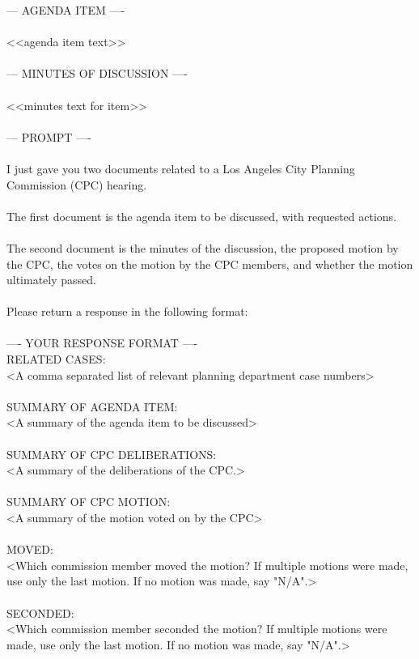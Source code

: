 --- AGENDA ITEM ----\\ 
\\ 
<<agenda item text>>\\ 
\\ 
--- MINUTES OF DISCUSSION ----\\ 
\\ 
<<minutes text for item>>\\ 
\\ 
--- PROMPT ----\\ 
\\ 
I just gave you two documents related to a Los Angeles City Planning Commission (CPC) hearing.\\ 
\\ 
The first document is the agenda item to be discussed, with requested actions.\\ 
\\ 
The second document is the minutes of the discussion, the proposed motion by the CPC, the votes on the motion by the CPC members, and whether the motion ultimately passed.\\ 
\\ 
Please return a response in the following format:\\ 
\\ 
---- YOUR RESPONSE FORMAT ----\\ 
RELATED CASES:\\ 
<A comma separated list of relevant planning department case numbers>\\ 
\\ 
SUMMARY OF AGENDA ITEM:\\ 
<A summary of the agenda item to be discussed>\\ 
\\ 
SUMMARY OF CPC DELIBERATIONS:\\ 
<A summary of the deliberations of the CPC.>\\ 
\\ 
SUMMARY OF CPC MOTION:\\ 
<A summary of the motion voted on by the CPC>\\ 
\\ 
MOVED:\\ 
<Which commission member moved the motion? If multiple motions were made, use only the last motion. If no motion was made, say "N/A".>\\ 
\\ 
SECONDED:\\ 
<Which commission member seconded the motion? If multiple motions were made, use only the last motion. If no motion was made, say "N/A".>